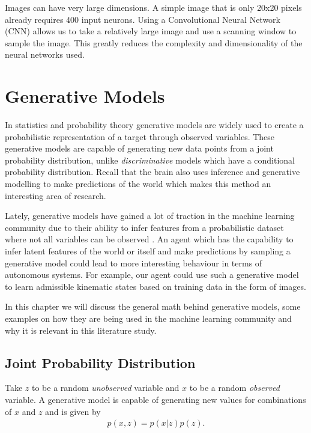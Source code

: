 \documentclass[main.tex]{subfiles}
\begin{document}
Images can have very large dimensions. A simple image that is only 20x20 pixels already requires 400 input neurons. Using a Convolutional Neural Network (CNN) allows us to take a relatively large image and use a scanning window to sample the image. This greatly reduces the complexity and dimensionality of the neural networks used.


\chapter{Generative Models}
In statistics and probability theory generative models are widely used to create a probabilistic representation of a target through observed variables. These generative models are capable of generating new data points from a joint probability distribution, unlike \textit{discriminative} models which have a conditional probability distribution.  Recall that the brain also uses inference and generative modelling to make predictions of the world which makes this method an interesting area of research.

Lately, generative models have gained a lot of traction in the machine learning community due to their ability to infer features from a probabilistic dataset where not all variables can be observed \cite{Goodfellow-et-al-2016}. An agent which has the capability to infer latent features of the world or itself and make predictions by sampling a generative model could lead to more interesting behaviour in terms of autonomous systems. For example, our agent could use such a generative model to learn admissible kinematic states based on training data in the form of images.

In this chapter we will discuss the general math behind generative models, some examples on how they are being used in the machine learning community and why it is relevant in this literature study.

\section{Joint Probability Distribution}
Take $z$ to be a random \textit{unobserved} variable and $x$ to be a random \textit{observed} variable.
A generative model is capable of generating new values for combinations of $x$ and $z$ and is given by
\begin{align}
    \label{eq:generative_model}
    p(x,z) = p(x|z)p(z).
\end{align}
\end{document}
